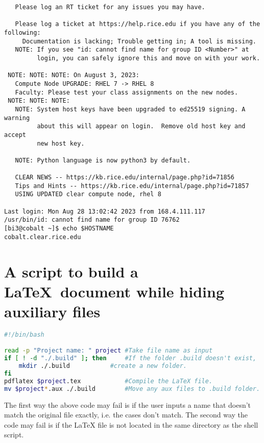 \documentclass{article}
\begin{document}
\begin{verbatim}
   Please log an RT ticket for any issues you may have.

   Please log a ticket at https://help.rice.edu if you have any of the following:
     Documentation is lacking; Trouble getting in; A tool is missing.
   NOTE: If you see "id: cannot find name for group ID <Number>" at
         login, you can safely ignore this and move on with your work.

 NOTE: NOTE: NOTE: On August 3, 2023:
   Compute Node UPGRADE: RHEL 7 -> RHEL 8
   Faculty: Please test your class assignments on the new nodes.
 NOTE: NOTE: NOTE: 
   NOTE: System host keys have been upgraded to ed25519 signing. A warning
         about this will appear on login.  Remove old host key and accept
         new host key.

   NOTE: Python language is now python3 by default.

   CLEAR NEWS -- https://kb.rice.edu/internal/page.php?id=71856
   Tips and Hints -- https://kb.rice.edu/internal/page.php?id=71857
   USING UPDATED clear compute node, rhel 8

Last login: Mon Aug 28 13:02:42 2023 from 168.4.111.117
/usr/bin/id: cannot find name for group ID 76762
[bi3@cobalt ~]$ echo $HOSTNAME
cobalt.clear.rice.edu

\end{verbatim}

\section{A script to build a \LaTeX\ document while hiding auxiliary files}



\begin{lstlisting}[language=bash,basicstyle=\ttfamily]
#!/bin/bash

read -p "Project name: " project #Take file name as input
if [ ! -d "./.build" ]; then     #If the folder .build doesn't exist,
	mkdir ./.build           #create a new folder.
fi
pdflatex $project.tex            #Compile the LaTeX file.
mv $project*.aux ./.build        #Move any aux files to .build folder.       
\end{lstlisting}

The first way the above code may fail is if the user inputs a name that doesn't match the original file exactly, i.e. the cases don't match. The second way the code may fail is if the LaTeX file is not located in the same directory as the shell script.
\end{document}

